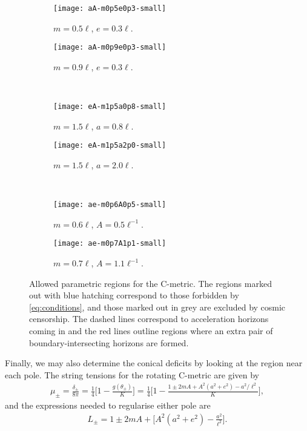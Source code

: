 \documentclass[
twoside,
openright,
frontopenright,
]{dmathesis}
\begin{document}
\begin{figure}
  \centering
  \begin{subfigure}[b]{0.45\textwidth}
    \texttt{[image: aA-m0p5e0p3-small]}
    \caption{\label{fig:aA-m0p5e0p3}$m=0.5\ell$, $e=0.3\ell$.}
  \end{subfigure}\qquad
  \begin{subfigure}[b]{0.45\textwidth}
    \texttt{[image: aA-m0p9e0p3-small]}
    \caption{\label{fig:aA-m0p9e0p3}$m=0.9\ell$, $e=0.3\ell$.}
  \end{subfigure} \\
  \begin{subfigure}[b]{0.45\textwidth}
    \texttt{[image: eA-m1p5a0p8-small]}
    \caption{\label{fig:eA-m1p5a0p8}$m=1.5\ell$, $a=0.8\ell$.}
  \end{subfigure}\qquad
  \begin{subfigure}[b]{0.45\textwidth}
    \texttt{[image: eA-m1p5a2p0-small]}
    \caption{\label{fig:eA-m1p5a2p0}$m=1.5\ell$, $a=2.0\ell$.}
  \end{subfigure} \\
  \begin{subfigure}[b]{0.45\textwidth}
    \texttt{[image: ae-m0p6A0p5-small]}
    \caption{\label{fig:ae-m0p6A0p5}$m=0.6\ell$, $A=0.5\ell^{-1}$.}
  \end{subfigure}\qquad
  \begin{subfigure}[b]{0.45\textwidth}
    \texttt{[image: ae-m0p7A1p1-small]}
    \caption{\label{fig:ae-m1p6A1p3}$m=0.7\ell$, $A=1.1\ell^{-1}$.}
  \end{subfigure}
  \caption{\label{fig:param-regions}Allowed parametric regions for the
    C-metric. The regions marked out with blue hatching correspond to those
    forbidden by \cref{eq:conditions}, and those marked out in grey are excluded
    by cosmic censorship. The dashed lines correspond to acceleration horizons
    coming in and the red lines outline regions where an extra pair of
    boundary-intersecting horizons are formed.}
\end{figure}

Finally, we may also determine the conical deficits by looking at the region
near each pole. The string tensions for the rotating C-metric are given by
\begin{align}
\mu_\pm = \frac{\delta_\pm}{8\pi}=\frac14\bigg[1-\frac{g(\theta_\pm)}{K}\bigg] =
  \frac14\bigg[1-\frac{1\pm 2mA + A^2(a^2+e^2)-a^2/\ell^2}{K}\bigg], 
\end{align}
and the expressions needed to regularise either pole are
\begin{align}
L_\pm=1\pm 2mA + \bigg[A^2(a^2+e^2)-\frac{a^2}{\ell^2}\bigg].
\end{align}
\end{document}
